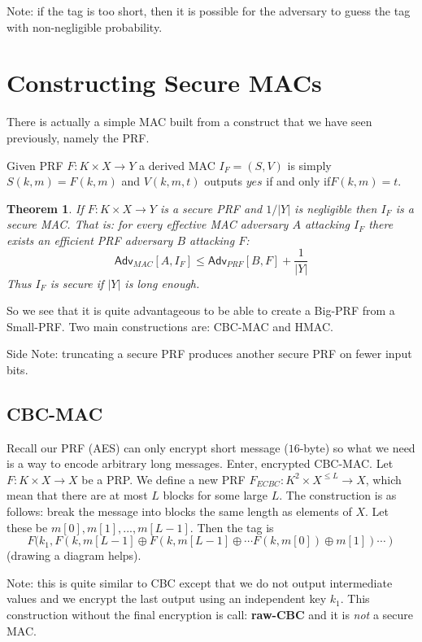 \documentclass[twoside]{article}
\newcounter{lecnum}
\newtheorem{theorem}{Theorem}[lecnum]
\def\Adv{\mathsf{Adv}}
\def\xor{\oplus}
\begin{document}
Note: if the tag is too short, then it is possible for the adversary to guess the tag with non-negligible probability.

\section{Constructing Secure MACs}

There is actually a simple MAC built from a construct that we have seen previously, namely the PRF. 

Given PRF $F: K \times X \rightarrow Y$ a derived MAC $I_{F} = (S, V)$ is simply $S(k, m) = F(k, m)$ and $V(k, m, t)$ outputs $yes$ if and only if$F(k, m) = t$.

\begin{theorem}
If $F: K \times X \rightarrow Y$ is a secure PRF and $1/ |Y|$ is negligible then $I_F$ is a secure MAC. That is: for every effective MAC adversary $A$ attacking $I_F$ there exists an efficient PRF adversary $B$ attacking $F$: 
\[\Adv_{MAC}[A, I_F] \leq \Adv_{PRF}[B, F] + \frac{1}{|Y|}\]
Thus $I_F$ is secure if $|Y|$ is long enough. 
\end{theorem}

So we see that it is quite advantageous to be able to create a Big-PRF from a Small-PRF. Two main constructions are: CBC-MAC and HMAC. 

Side Note: truncating a secure PRF produces another secure PRF on fewer input bits.

\subsection{CBC-MAC}
Recall our PRF (AES) can only encrypt short message ($16$-byte) so what we need is a way to encode arbitrary long messages. Enter, encrypted CBC-MAC. Let $F: K \times X \rightarrow X$ be a PRP. We define a new PRF $F_{ECBC}:K^2 \times X^{\leq L} \rightarrow X$, which mean that there are at most $L$ blocks for some large $L$. The construction is as follows: break the message into blocks the same length as elements of $X$. Let these be $m[0], m[1], ..., m[L-1]$. Then the tag is 
\[F(k_1, F(k, m[L-1] \xor F(k, m[L-1] \xor \cdots F(k, m[0]) \xor m[1]) \cdots )\]
(drawing a diagram helps).   

Note: this is quite similar to CBC except that we do not output intermediate values and we encrypt the last output using an independent key $k_1$. This construction without the final encryption is call: \textbf{raw-CBC} and it is \emph{not} a secure MAC.
\end{document}
